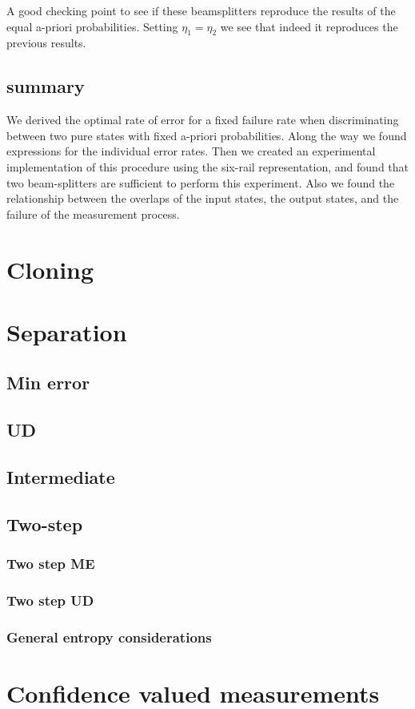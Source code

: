 \documentclass[12pt,oneside,english,reqno]{amsbook}
\numberwithin{section}{chapter}
\numberwithin{equation}{section}
\numberwithin{figure}{section}
\begin{document}
A good checking point to see if these beamsplitters reproduce the
results of the equal a-priori probabilities. Setting $\eta_{1}=\eta_{2}$
we see that indeed it reproduces the previous results. 


\section{summary}

We derived the optimal rate of error for a fixed failure rate when
discriminating between two pure states with fixed a-priori probabilities.
Along the way we found expressions for the individual error rates.
Then we created an experimental implementation of this procedure using
the six-rail representation, and found that two beam-splitters are
sufficient to perform this experiment. Also we found the relationship
between the overlaps of the input states, the output states, and the
failure of the measurement process.
\chapter{Cloning}

\chapter{Separation}

\section{Min error}

\section{UD}

\section{Intermediate}

\section{Two-step}

\subsection{Two step ME}
\subsection{Two step UD}
\subsection{General entropy considerations}
\chapter{Confidence valued measurements}
\end{document}
